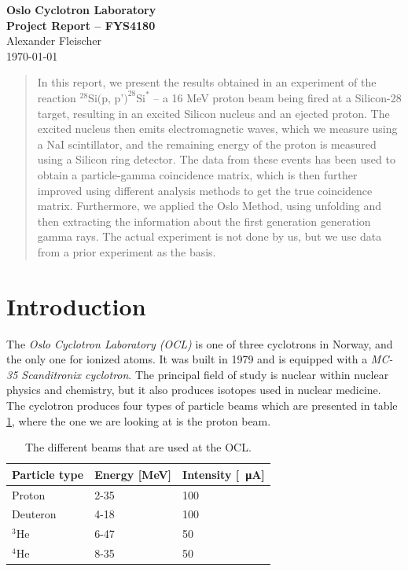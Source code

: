 \documentclass[a4paper,12pt]{article}
\title{}
\begin{document}
{\centering
{\bfseries\LARGE Oslo Cyclotron Laboratory}
\\[1em]
{\bfseries\large Project Report -- FYS4180}
\\[1em]
    \normalsize Alexander Fleischer\\[1em] \today \\}
\begin{abstract}
    In this report,
    we present the results obtained in an experiment of 
    the reaction $^{28}\text{Si(p, p')}^{28}\text{Si}^*$ -- a 16 
    MeV proton beam being fired at a Silicon-28 target,
    resulting in an excited Silicon nucleus and an ejected proton.
    The excited nucleus then emits electromagnetic waves,
    which we measure using a NaI scintillator,
    and the remaining energy of the proton is measured using
    a Silicon ring detector.
    The data from these events has been used to obtain a 
    particle-gamma coincidence matrix, which is then further improved
    using different analysis methods to get the true
    coincidence matrix.
    Furthermore, we applied the Oslo Method,
    using unfolding and then extracting the information about
    the first generation generation gamma rays.
    The actual experiment is not done by us, but we use data from a
    prior experiment as the basis.
\end{abstract}

\section{Introduction}

The \textit{Oslo Cyclotron Laboratory (OCL)} is one of three cyclotrons
in Norway, and the only one for ionized atoms.
It was built in 1979 and is equipped with a 
\textit{MC-35 Scanditronix cyclotron}.
The principal field of study is nuclear within nuclear physics and chemistry,
but it also produces isotopes used in nuclear medicine.
The cyclotron produces four types of particle beams which are presented in
table \ref{tab:beams},
where the one we are looking at is the proton beam.

\begin{table}[h!]
    \centering
    \begin{tabularx}{\columnwidth}{| X | X | X |}
        \hline
        Particle type & Energy [MeV] & Intensity [\SI{}{\micro\ampere}]\\
        \hline\hline
        Proton & 2-35 & 100\\ \hline
        Deuteron & 4-18 & 100\\ \hline
        $^3$He & 6-47 & 50\\ \hline
        $^4$He & 8-35 & 50\\ \hline
    \end{tabularx}
    \caption{The different beams that are used at the OCL.}
    \label{tab:beams}
\end{table}
\end{document}
